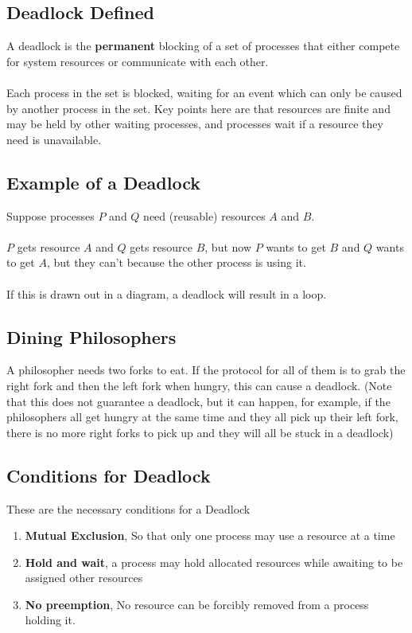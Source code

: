 \documentclass{article}
\begin{document}
\subsection{Deadlock Defined}

A deadlock is the \textbf{permanent} blocking of a set of processes that either compete for system resources or communicate with each other.
\\
\\
Each process in the set is blocked, waiting for an event which can only be caused by another process in the set. Key points here are that resources are finite and may be held by other waiting processes, and processes wait if a resource they need is unavailable.

\subsection{Example of a Deadlock}

Suppose processes $P$ and $Q$ need (reusable) resources $A$ and $B$.\\
\\
$P$ gets resource $A$ and $Q$ gets resource $B$, but now $P$ wants to get $B$ and $Q$ wants to get $A$, but they can't because the other process is using it.
\\
\\
If this is drawn out in a diagram, a deadlock will result in a loop.

\subsection{Dining Philosophers}

A philosopher needs two forks to eat. If the protocol for all of them is to grab the right fork and then the left fork when hungry, this can cause a deadlock. (Note that this does not guarantee a deadlock, but it can happen, for example, if the philosophers all get hungry at the same time and they all pick up their left fork, there is no more right forks to pick up and they will all be stuck in a deadlock)

\subsection{Conditions for Deadlock}

These are the necessary conditions for a Deadlock

\begin{enumerate}
  \item \textbf{Mutual Exclusion}, So that only one process may use a resource at a time
  \item \textbf{Hold and wait}, a process may hold allocated resources while awaiting to be assigned other resources
  \item \textbf{No preemption}, No resource can be forcibly removed from a process holding it.
\end{enumerate}
\end{document}
